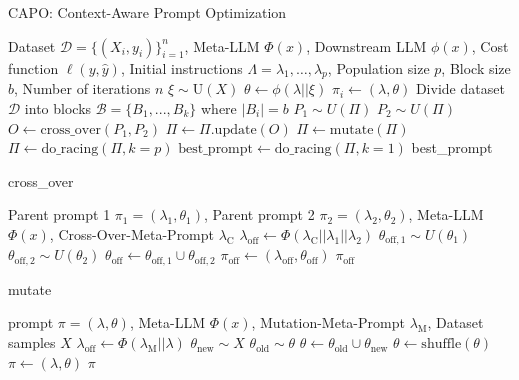 \documentclass{article}
\begin{document}
\begin{algorithm}
    \caption{CAPO: Context-Aware Prompt Optimization}
    \begin{algorithmic}[1]
    \Require Dataset $\mathcal{D} = \{(X_i, y_i)\}_{i=1}^n$, Meta-LLM $\Phi(x)$, Downstream LLM $\phi(x)$, Cost function $\ell(y, \hat{y})$, Initial instructions $\Lambda = {\lambda_1, \dots, \lambda_p}$, Population size $p$, Block size $b$, Number of iterations $n$
    \For{$\lambda \in \Lambda$} 
        \State $\xi \sim \text{U}(X)$
        \State $\theta \gets \phi(\lambda||\xi)$   
        \State $\pi_i \gets (\lambda, \theta)$
    \EndFor
    \State Divide dataset $\mathcal{D}$ into blocks $\mathcal{B} = \{B_1, ..., B_k\}$ where $|B_i| = b$
        \State $P_1 \sim U(\Pi)$
        \State $P_2 \sim U(\Pi)$
        \State $O \gets \text{cross\_over}(P_1, P_2)$
        \State $\Pi \gets \Pi.\text{update}(O)$
        \State $\Pi \gets \text{mutate}(\Pi)$
        \State $\Pi \gets \text{do\_racing}(\Pi, k=p)$
    \EndFor
    \State $\text{best\_prompt} \gets \text{do\_racing}(\Pi, k=1)$
    \State \Return best\_prompt
    \end{algorithmic}
\end{algorithm}

\begin{algorithm}
    \caption{cross\_over}
    \begin{algorithmic}[1]
        \Require Parent prompt 1 $\pi_1 = (\lambda_1, \theta_1)$, Parent prompt 2 $\pi_2 = (\lambda_2, \theta_2)$, Meta-LLM $\Phi(x)$, Cross-Over-Meta-Prompt $\lambda_{\text{C}}$
        \State $\lambda_{\text{off}} \gets \Phi(\lambda_{\text{C}} || \lambda_1 || \lambda_2)$
        \State $\theta_{\text{off}, 1} \sim U(\theta_1)$
        \State $\theta_{\text{off}, 2} \sim U(\theta_2)$
        \State $\theta_{\text{off}} \gets \theta_{\text{off}, 1} \cup \theta_{\text{off}, 2}$
        \State $\pi_{\text{off}} \gets (\lambda_{\text{off}}, \theta_{\text{off}})$
        \State \Return $\pi_{\text{off}}$
    \end{algorithmic}
\end{algorithm}

\begin{algorithm}
    \caption{mutate}
    \begin{algorithmic}[1]
        \Require prompt $\pi = (\lambda, \theta)$, Meta-LLM $\Phi(x)$, Mutation-Meta-Prompt $\lambda_{\text{M}}$, Dataset samples $X$
        \State $\lambda_{\text{off}} \gets \Phi(\lambda_{\text{M}} || \lambda)$
        \State $\theta_{\text{new}} \sim X$
        \State $\theta_{\text{old}} \sim \theta$
        \State $\theta \gets \theta_{\text{old}} \cup \theta_{\text{new}}$
        \State $\theta \gets \text{shuffle}(\theta)$
        \State $\pi \gets (\lambda, \theta)$
        \State \Return $\pi$
    \end{algorithmic}
\end{algorithm}
\end{document}
